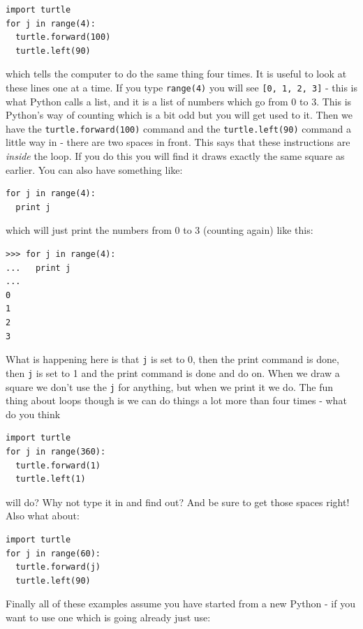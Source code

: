 \documentclass[a4paper, 11pt]{book}
\begin{document}
{\small
\begin{verbatim}
import turtle
for j in range(4):
  turtle.forward(100)
  turtle.left(90)
\end{verbatim}
}

\noindent 
which tells the computer to do the same thing four times. It is useful to look at these lines one at a time. If you type \verb|range(4)| you will see \verb|[0, 1, 2, 3]| - this is what Python calls a list, and it is a list of numbers which go from 0 to 3. This is Python's way of counting which is a bit odd but you will get used to it. Then we have the \verb|turtle.forward(100)| command and the \verb|turtle.left(90)| command a little way in - there are two spaces in front. This says that these instructions are \emph{inside} the loop. If you do this you will find it draws exactly the same square as earlier. You can also have something like:

{\small
\begin{verbatim}
for j in range(4):
  print j
\end{verbatim}
}

\noindent 
which will just print the numbers from 0 to 3 (counting again) like this:

{\small
\begin{verbatim}
>>> for j in range(4):
...   print j
... 
0
1
2
3
\end{verbatim}
}

\noindent
What is happening here is that \verb|j| is set to 0, then the print command is done, then \verb|j| is set to 1 and the print command is done and do on. When we draw a square we don't use the \verb|j| for anything, but when we print it we do. The fun thing about loops though is we can do things a lot more than four times - what do you think

{\small
\begin{verbatim}
import turtle
for j in range(360):
  turtle.forward(1)
  turtle.left(1)
\end{verbatim}
}

\noindent
will do? Why not type it in and find out? And be sure to get those
spaces right! Also what about:

{\small
\begin{verbatim}
import turtle
for j in range(60):
  turtle.forward(j)
  turtle.left(90)
\end{verbatim}
}

Finally all of these examples assume you have started from a new
Python - if you want to use one which is going already just use:
\end{document}
